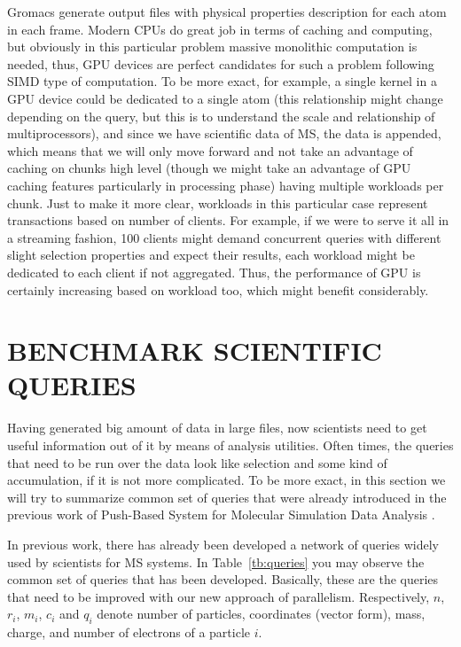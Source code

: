 \documentclass[12pt,letterpaper]{report}
\begin{document}
\noindent\hspace{3em}Gromacs generate output files with physical properties description for each atom in each frame. Modern CPUs do great job in terms of caching and computing, but obviously in this particular problem massive monolithic computation is needed, thus, GPU devices are perfect candidates for such a problem following SIMD type of computation. To be more exact, for example, a single kernel in a GPU device could be dedicated to a single atom (this relationship might change depending on the query, but this is to understand the scale and relationship of multiprocessors), and since we have scientific data of MS, the data is appended, which means that we will only move forward and not take an advantage of caching on chunks high level (though we might take an advantage of GPU caching features particularly in processing phase) having multiple workloads per chunk. Just to make it more clear, workloads in this particular case represent transactions based on number of clients. For example, if we were to serve it all in a streaming fashion, 100 clients might demand concurrent queries with different slight selection properties and expect their results, each workload might be dedicated to each client if not aggregated. Thus, the performance of GPU is certainly increasing based on workload too, which might benefit considerably.


\chapter{BENCHMARK SCIENTIFIC QUERIES}\label{sc:querynetwork}
\hspace{3em} Having generated big amount of data in large files, now scientists need to get useful information out of it by means of analysis utilities. Often times, the queries that need to be run over the data look like selection and some kind of accumulation, if it is not more complicated. To be more exact, in this section we will try to summarize common set of queries that were already introduced in the previous work of Push-Based System for Molecular Simulation Data Analysis \cite{mainPaper}. 

\noindent\hspace{3em}In previous work, there has already been developed a network of queries widely used by scientists for MS systems. In Table~\ref{tb:queries} you may observe the common set of queries that has been developed. Basically, these are the queries that need to be improved with our new approach of parallelism. Respectively, $n$, $r_i$, $m_i$, $c_i$ and $q_i$ denote number of particles, coordinates (vector form), mass, charge, and number of electrons of a particle $i$.
\end{document}
